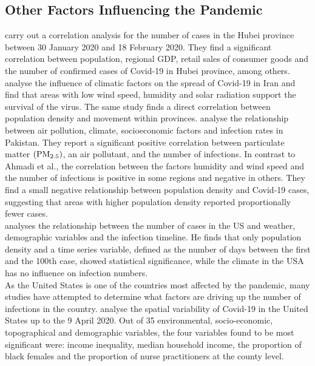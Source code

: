 \subsection{Other Factors Influencing the Pandemic}
\cite{xiong2020spatial} carry out a correlation analysis for the number of cases in the Hubei province between 30 January 2020 and 18 February 2020. They find a significant correlation between population, regional GDP, retail sales of consumer goods and the number of confirmed cases of Covid-19 in Hubei province, among others. \\
\cite{ahmadi2020investigation} analyse the influence of climatic factors on the spread of Covid-19 in Iran and find that areas with low wind speed, humidity and solar radiation support the survival of the virus. The same study finds a direct correlation between population density and movement within provinces. \cite{mehmood2021spatiotemporal} analyse the relationship between air pollution, climate, socioeconomic factors and infection rates in Pakistan. They report a significant positive correlation between particulate matter $\left(\hbox{PM}_{2.5}\right)$, an air pollutant, and the number of infections. In contrast to Ahmadi et al., the correlation between the factors humidity and wind speed and the number of infections is positive in some regions and negative in others. They find a small negative relationship between population density and Covid-19 cases, suggesting that areas with higher population density reported proportionally fewer cases.\\
\cite{pedrosa2020dynamics} analyses the relationship between the number of cases in the US and weather, demographic variables and the infection timeline. He finds that only population density and a time series variable, defined as the number of days between the first and the 100th case, showed statistical significance, while the climate in the USA has no influence on infection numbers.\\
As the United States is one of the countries most affected by the pandemic, many studies have attempted to determine what factors are driving up the number of infections in the country. \cite{mollalo2020gis} analyse the spatial variability of Covid-19 in the United States up to the 9 April 2020. Out of 35 environmental, socio-economic, topographical and demographic variables, the four variables found to be most significant were: income inequality, median household income, the proportion of black females and the proportion of nurse practitioners at the county level. \\

